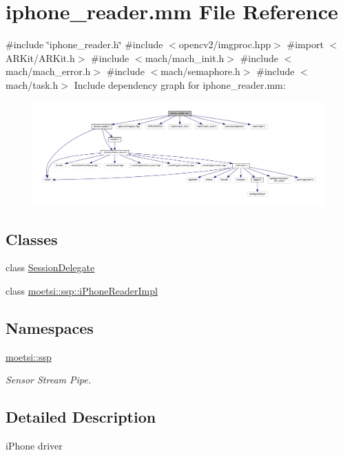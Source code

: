 \hypertarget{iphone__reader_8mm}{}\section{iphone\+\_\+reader.\+mm File Reference}
\label{iphone__reader_8mm}
{\ttfamily \#include \char`\"{}iphone\+\_\+reader.\+h\char`\"{}}\newline
{\ttfamily \#include $<$opencv2/imgproc.\+hpp$>$}\newline
{\ttfamily \#import $<$A\+R\+Kit/\+A\+R\+Kit.\+h$>$}\newline
{\ttfamily \#include $<$mach/mach\+\_\+init.\+h$>$}\newline
{\ttfamily \#include $<$mach/mach\+\_\+error.\+h$>$}\newline
{\ttfamily \#include $<$mach/semaphore.\+h$>$}\newline
{\ttfamily \#include $<$mach/task.\+h$>$}\newline
Include dependency graph for iphone\+\_\+reader.\+mm\+:\nopagebreak
\begin{figure}[H]
\begin{center}
\leavevmode
\includegraphics[width=350pt]{iphone__reader_8mm__incl}
\end{center}
\end{figure}
\subsection*{Classes}
\begin{DoxyCompactItemize}
\item 
class \hyperlink{interfaceSessionDelegate}{Session\+Delegate}
\item 
class \hyperlink{classmoetsi_1_1ssp_1_1iPhoneReaderImpl}{moetsi\+::ssp\+::i\+Phone\+Reader\+Impl}
\end{DoxyCompactItemize}
\subsection*{Namespaces}
\begin{DoxyCompactItemize}
\item 
 \hyperlink{namespacemoetsi_1_1ssp}{moetsi\+::ssp}
\begin{DoxyCompactList}\small\item\em Sensor Stream Pipe. \end{DoxyCompactList}\end{DoxyCompactItemize}


\subsection{Detailed Description}
i\+Phone driver 